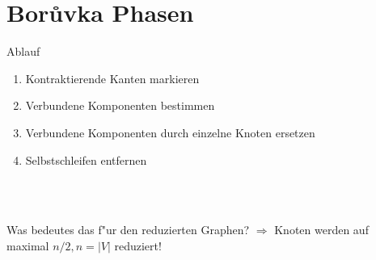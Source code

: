 \documentclass[10pt]{beamer}
\newcommand{\gap}{\ \\ \ \\}
\begin{document}
\section{Bor\r uvka Phasen}
\begin{frame}{Ablauf}
    \begin{enumerate}
        \item Kontraktierende Kanten markieren
        \item Verbundene Komponenten bestimmen
        \item Verbundene Komponenten durch einzelne Knoten ersetzen
        \item Selbstschleifen entfernen
    \end{enumerate}
    \gap
    \begin{block}{Was bedeutes das f"ur den reduzierten Graphen?}
    $\Rightarrow$ Knoten werden auf maximal $n/2, n = |V|$ reduziert!\\
    \end{block}
\end{frame}
\end{document}
